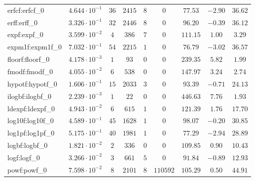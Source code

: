 \begin{tabular}{|l|c|c|c|c|c|c|c|c|}
erfcf:erfcf\_0               & $ 4.644 \cdot 10^{-1} $ & $ 36     $ & $ 2415  $ & $ 8   $ & $ 0      $ & $ 77.53       $ & $ -2.90   $ & $ 36.62   $ \\
erff:erff\_0                 & $ 3.326 \cdot 10^{-1} $ & $ 32     $ & $ 2446  $ & $ 8   $ & $ 0      $ & $ 96.20       $ & $ -0.39   $ & $ 36.12   $ \\
expf:expf\_0                 & $ 3.599 \cdot 10^{-2} $ & $ 4      $ & $ 386   $ & $ 7   $ & $ 0      $ & $ 111.15      $ & $ 1.00    $ & $ 3.29    $ \\
expm1f:expm1f\_0             & $ 7.032 \cdot 10^{-1} $ & $ 54     $ & $ 2215  $ & $ 1   $ & $ 0      $ & $ 76.79       $ & $ -3.02   $ & $ 36.57   $ \\
floorf:floorf\_0             & $ 4.178 \cdot 10^{-3} $ & $ 1      $ & $ 93    $ & $ 0   $ & $ 0      $ & $ 239.35      $ & $ 5.82    $ & $ 1.99    $ \\
fmodf:fmodf\_0               & $ 4.055 \cdot 10^{-2} $ & $ 6      $ & $ 538   $ & $ 0   $ & $ 0      $ & $ 147.97      $ & $ 3.24    $ & $ 2.74    $ \\
hypotf:hypotf\_0             & $ 1.606 \cdot 10^{-1} $ & $ 15     $ & $ 2033  $ & $ 3   $ & $ 0      $ & $ 93.39       $ & $ -0.71   $ & $ 24.13   $ \\
ilogbf:ilogbf\_0             & $ 2.239 \cdot 10^{-3} $ & $ 1      $ & $ 22    $ & $ 0   $ & $ 0      $ & $ 446.63      $ & $ 7.76    $ & $ 1.93    $ \\
ldexpf:ldexpf\_0             & $ 4.943 \cdot 10^{-2} $ & $ 6      $ & $ 615   $ & $ 1   $ & $ 0      $ & $ 121.39      $ & $ 1.76    $ & $ 17.70   $ \\
log10f:log10f\_0             & $ 4.589 \cdot 10^{-1} $ & $ 45     $ & $ 1628  $ & $ 1   $ & $ 0      $ & $ 98.07       $ & $ -0.20   $ & $ 30.85   $ \\
log1pf:log1pf\_0             & $ 5.175 \cdot 10^{-1} $ & $ 40     $ & $ 1981  $ & $ 1   $ & $ 0      $ & $ 77.29       $ & $ -2.94   $ & $ 28.89   $ \\
logbf:logbf\_0               & $ 1.821 \cdot 10^{-2} $ & $ 2      $ & $ 336   $ & $ 0   $ & $ 0      $ & $ 109.85      $ & $ 0.90    $ & $ 10.43   $ \\
logf:logf\_0                 & $ 3.266 \cdot 10^{-2} $ & $ 3      $ & $ 661   $ & $ 5   $ & $ 0      $ & $ 91.84       $ & $ -0.89   $ & $ 12.93   $ \\
powf:powf\_0                 & $ 7.598 \cdot 10^{-2} $ & $ 8      $ & $ 2101  $ & $ 8   $ & $ 110592 $ & $ 105.29      $ & $ 0.50    $ & $ 44.91   $ \\

\end{tabular}
